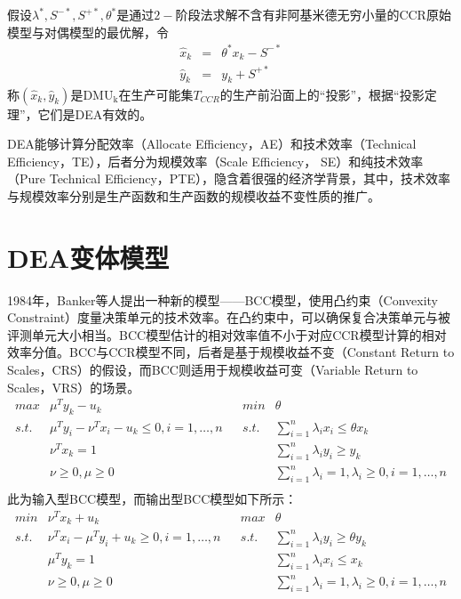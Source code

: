假设$\lambda^{*}, S^{-*},S^{+*}, \theta^{*}$是通过$2-$阶段法求解不含有非阿基米德无穷小量的CCR原始模型与对偶模型的最优解，令
\begin{equation}
  \begin{array}{lll}
    \hat{x}_k & = & \theta^{*} x_k - S^{-*} \\
    \hat{y}_k & = & y_k + S^{+*}
  \end{array}
\end{equation}
称$(\hat{x}_k, \hat{y}_k)$是$\mathrm{DMU_k}$在生产可能集$ T_{CCR}$的生产前沿面上的“投影”，根据“投影定理”\cite{wei2004dea}，它们是DEA有效的。

DEA能够计算分配效率（Allocate Efficiency，AE）和技术效率（Technical Efficiency，TE），后者分为规模效率（Scale Efficiency， SE）和纯技术效率（Pure Technical Efficiency，PTE），隐含着很强的经济学背景，其中，技术效率与规模效率分别是生产函数和生产函数的规模收益不变性质的推广\cite{wei2004dea}。

\section{DEA变体模型}
1984年，Banker等人\cite{banker1984some}提出一种新的模型——BCC模型，使用凸约束（Convexity Constraint）度量决策单元的技术效率。在凸约束中，可以确保复合决策单元与被评测单元大小相当。BCC模型估计的相对效率值不小于对应CCR模型计算的相对效率分值。BCC与CCR模型不同，后者是基于规模收益不变（Constant Return to Scales，CRS）的假设，而BCC则适用于规模收益可变（Variable Return to Scales，VRS）的场景。
\begin{equation}\label{eq:inputbcc}
  \begin{array}{lllll}
    \textit{max} & \mu^T y_k - u_k & & \textit{min} & \theta\\
    \textit{s.t.} & \mu^T y_i - \nu^T x_i  - u_k \le 0, i = 1,\ldots, n & & \textit{s.t.} & \sum\limits_{i=1}^n \lambda_i x_i \le \theta x_k\\
    & \nu^T x_k = 1 & & & \sum\limits_{i=1}^n \lambda_i y_i \ge y_k\\
    & \nu \ge 0,\mu \ge 0 & & & \sum\limits_{i=1}^n \lambda_i = 1,\lambda_i \ge 0, i = 1,\ldots, n\\
  \end{array}
\end{equation}
此为输入型BCC模型，而输出型BCC模型如下所示：
\begin{equation}\label{eq:outputbcc}
  \begin{array}{lllll}
    \textit{min} & \nu^T x_k + u_k & & \textit{max} & \theta\\
    \textit{s.t.} & \nu^T x_i - \mu^T y_i  + u_k \ge 0, i = 1,\ldots, n & & \textit{s.t.} & \sum\limits_{i=1}^n \lambda_i y_i \ge \theta y_k\\
    & \mu^T y_k = 1 & & & \sum\limits_{i=1}^n \lambda_i x_i \le x_k\\
    & \nu \ge 0,\mu \ge 0 & & & \sum\limits_{i=1}^n \lambda_i = 1,\lambda_i \ge 0, i = 1,\ldots, n\\
  \end{array}
\end{equation}

